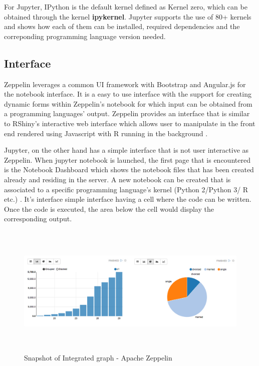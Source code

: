 \documentclass[9pt,twocolumn,twoside]{../../styles/osajnl}
\begin{document}
For Jupyter, IPython is the default kernel defined as Kernel zero, which can be obtained through the kernel \textbf{ipykernel}. Jupyter supports the use of 80+ kernels and \cite{www-jupyter-kernel} shows how each of them can be installed, required dependencies and the correponding programming language version needed.

\subsection{Interface}
Zeppelin leverages a common UI framework with Bootstrap and Angular.js for the notebook interface. It is a easy to use interface with the support for creating dynamic forms within Zeppelin's notebook for which input can be obtained from a programming languages' output. Zeppelin provides an interface that is similar to RShiny's interactive web interface which allows user to manipulate in the front end rendered using Javascript with R running in the background \cite{www-rshiny}. 

Jupyter, on the other hand has a simple interface that is not user interactive as Zeppelin. When jupyter notebook is launched, the first page that is encountered is the Notebook Dashboard which shows the notebook files that has been created already and residing in the server. A new notebook can be created that is associated to a specific programming language's kernel (Python 2/Python 3/ R etc.) \cite{www-jupyter-ui}. It's interface simple interface having a cell where the code can be written. Once the code is executed, the area below the cell would display the corresponding output.
\begin{figure}[hbt]
\begin{center}
\centering
\includegraphics[width =\linewidth,height=2.5in]{images/graph}
\caption{Snapshot of Integrated graph - Apache Zeppelin \cite{www-zeppelin}}
\label{fig:graphZep}
\end{center}
\end{figure}
\end{document}
